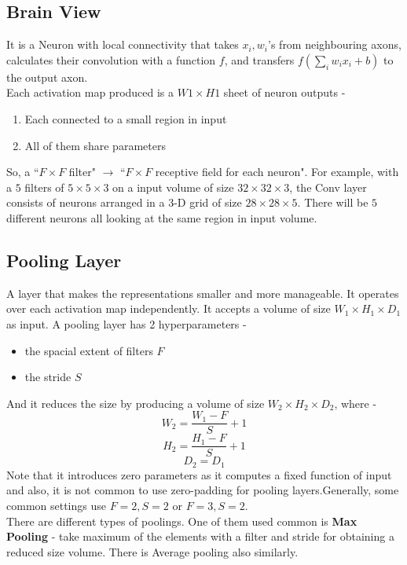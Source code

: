 \documentclass[12pt,a4paper]{article}
\begin{document}
\subsection{Brain View}
It is a Neuron with local connectivity that takes $x_i, w_i$'s from neighbouring axons, calculates their convolution with a function $f$, and transfers $f(\sum_i w_{i}x_{i} + b)$ to the output axon. \\
Each activation map produced is a $W1 \times H1$ sheet of neuron outputs - 
\begin{enumerate}
    \item Each connected to a small region in input
    \item All of them share parameters
\end{enumerate}
So, a ``$F \times F$ filter" $\xrightarrow{}$ ``$F\times F$ receptive field for each neuron". For example, with a $5$ filters of $5\times 5 \times 3$ on a input volume of size $32 \times 32 \times 3$, the Conv layer consists of neurons arranged in a 3-D grid of size $28 \times 28 \times 5$. There will be $5$ different neurons all looking at the same region in input volume.

\subsection{Pooling Layer}
A layer that makes the representations smaller and more manageable. It operates over each activation map independently. It accepts a volume of size $W_1 \times H_1 \times D_1$ as input. A pooling layer has 2 hyperparameters - 
\begin{itemize}
    \item the spacial extent of filters $F$
    \item the stride $S$
\end{itemize}
And it reduces the size by producing a volume of size $W_2 \times H_2 \times D_2$, where -
\begin{equation*}
    W_2 = \frac{W_1 - F}{S} + 1
\end{equation*}
\begin{equation*}
    H_2 = \frac{H_1 - F}{S} + 1
\end{equation*}
\begin{equation*}
    D_2 = D_1
\end{equation*}
Note that it introduces zero parameters as it computes a fixed function of input and also, it is not common to use zero-padding for pooling layers.Generally, some common settings use $F = 2, S = 2$ or $F = 3, S = 2$. \\
There are different types of poolings. One of them used common is \textbf{Max Pooling} - take maximum of the elements with a filter and stride for obtaining a reduced size volume. There is Average pooling also similarly.
\end{document}
